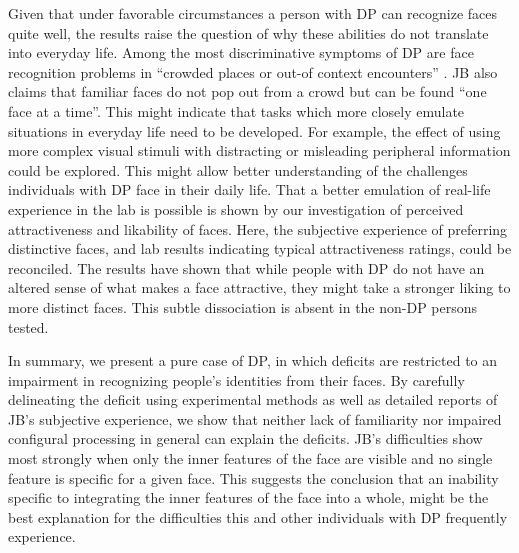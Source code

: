 \documentclass[fleqn,10pt]{SelfArx} %
\begin{document}
Given that under favorable circumstances a person with DP can recognize faces quite well, the results raise the question of why these abilities do not translate into everyday life. Among the most discriminative symptoms of DP are face recognition problems in “crowded places or out-of context encounters” \citep{Gr_ter_2008}. JB also claims that familiar faces do not pop out from a crowd but can be found “one face at a time”. This might indicate that tasks which more closely emulate situations in everyday life need to be developed. For example, the effect of using more complex visual stimuli with distracting or misleading peripheral information could be explored. This might allow better understanding of the challenges individuals with DP face in their daily life.
That a better emulation of real-life experience in the lab is possible is shown by our investigation of perceived attractiveness and likability of faces. Here, the subjective experience of preferring distinctive faces, and lab results indicating typical attractiveness ratings, could be reconciled. The results have shown that while people with DP do not have an altered sense of what makes a face attractive, they might take a stronger liking to more distinct faces. This subtle dissociation is absent in the non-DP persons tested.

In summary, we present a pure case of DP, in which deficits are restricted to an impairment in recognizing people's identities from their faces. By carefully delineating the deficit using experimental methods as well as detailed reports of JB's subjective experience, we show that neither lack of familiarity nor impaired configural processing in general can explain the deficits. JB's difficulties show most strongly when only the inner features of the face are visible and no single feature is specific for a given face. This suggests the conclusion that an inability specific to integrating the inner features of the face into a whole, might be the best explanation for the difficulties this and other individuals with DP frequently experience.
\end{document}
